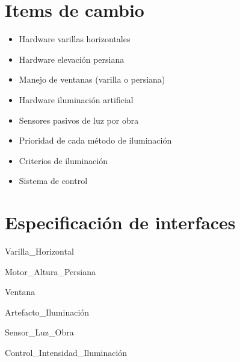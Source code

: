 \documentclass[12pt,a4paper,fleqn]{article}
\begin{document}
\section{Items de cambio}
\begin{itemize}
  \item Hardware varillas horizontales
  \item Hardware elevación persiana
  \item Manejo de ventanas (varilla o persiana)
  \item Hardware iluminación artificial
  \item Sensores pasivos de luz por obra
  \item Prioridad de cada método de iluminación
  \item Criterios de iluminación
  \item Sistema de control
\end{itemize}

\section{Especificación de interfaces}

\begin{module}{Varilla\_Horizontal}
\eproc
{}
\end{module}

\begin{module}{Motor\_Altura\_Persiana}
\eproc
{}
\end{module}

\begin{module}{Ventana}
\eproc
{}
\end{module}

\begin{module}{Artefacto\_Iluminación}
\eproc
{}
\end{module}

\begin{module}{Sensor\_Luz\_Obra}
\eproc
{}
\end{module}

\begin{module}{Control\_Intensidad\_Iluminación}
\eproc
{}
\end{module}
\end{document}
